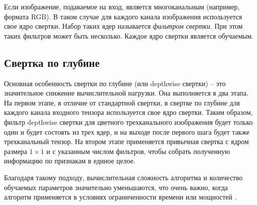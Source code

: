 Если изображение, подаваемое на вход, является многоканальным (например, формата RGB). В таком случае для каждого канала изображения используется свое ядро свертки. Набор таких ядер называется \textit{фильтром свертки}. При этом таких фильтров может быть несколько. Каждое ядро свертки является обучаемым.

\subsection{Свертка по глубине}
Основная особенность свертки по глубине (или depthwise свертки) \cite{mobilenet} -- это значительное снижение вычислительной нагрузки. Она выполняется в два этапа. На первом этапе, в отличие от стандартной свертки, в свертке по глубине для каждого канала входного тензора используется свое ядро свертки. Таким образом, фильтр depthwise свертки для цветного трехканального изображения будет только один и будет состоять из трех ядер, и на выходе после первого шага будет также трехканальный тензор. На втором этапе применяется привычная свертка с ядром размера $1 \times 1$ и с указанным числом фильтров, чтобы собрать полученную информацию по признакам в единое целое.

Благодаря такому подходу, вычислительная сложность алгоритма и количество обучаемых параметров значительно уменьшаются, что очень важно, когда алгоритм применяется в условиях ограниченности времени или мощностей \cite[2-3]{mobilenet}.

